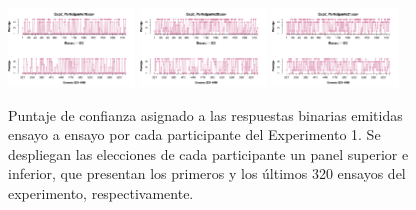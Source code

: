\begin{figure}[th]
\includegraphics[width=0.30\textwidth]{Figures/Rating_Exp2_P19} \includegraphics[width=0.30\textwidth]{Figures/Rating_Exp2_P20} \includegraphics[width=0.30\textwidth]{Figures/Rating_Exp2_P21}
\caption[Puntajes de Confianza asignados ensayo a ensayo; Experimento 2]{Puntaje de confianza asignado a las respuestas binarias emitidas ensayo a ensayo por cada participante del Experimento 1. Se despliegan las elecciones de cada participante un panel superior e inferior, que presentan los primeros y los últimos 320 ensayos del experimento, respectivamente.}
\label{fig:Rating_E2}
\end{figure}











